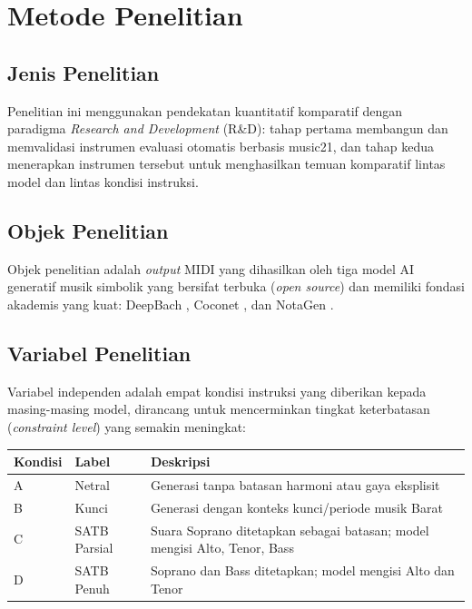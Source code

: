 \section{Metode Penelitian}

\subsection{Jenis Penelitian}

Penelitian ini menggunakan pendekatan kuantitatif komparatif dengan paradigma \textit{Research and Development} (R\&D): tahap pertama membangun dan memvalidasi instrumen evaluasi otomatis berbasis music21, dan tahap kedua menerapkan instrumen tersebut untuk menghasilkan temuan komparatif lintas model dan lintas kondisi instruksi.

\subsection{Objek Penelitian}

Objek penelitian adalah \textit{output} MIDI yang dihasilkan oleh tiga model AI generatif musik simbolik yang bersifat terbuka (\textit{open source}) dan memiliki fondasi akademis yang kuat: DeepBach \parencite{hadjeres2017}, Coconet \parencite{huang2017}, dan NotaGen \parencite{wang2025}.

\subsection{Variabel Penelitian}

Variabel independen adalah empat kondisi instruksi yang diberikan kepada masing-masing model, dirancang untuk mencerminkan tingkat keterbatasan (\textit{constraint level}) yang semakin meningkat:

\begin{table}[ht]
\centering
\begin{tabularx}{\textwidth}{|l|l|X|}
\hline
\textbf{Kondisi} & \textbf{Label} & \textbf{Deskripsi} \\ \hline
A & Netral & Generasi tanpa batasan harmoni atau gaya eksplisit \\ \hline
B & Kunci & Generasi dengan konteks kunci/periode musik Barat \\ \hline
C & SATB Parsial & Suara Soprano ditetapkan sebagai batasan; model mengisi Alto, Tenor, Bass \\ \hline
D & SATB Penuh & Soprano dan Bass ditetapkan; model mengisi Alto dan Tenor \\ \hline
\end{tabularx}
\end{table}

